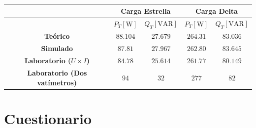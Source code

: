 \documentclass[letter,11pt]{article}
\begin{document}
\begin{center}
    \begin{tabular}{|c||c|c|c|c|}
    \hline
    & \multicolumn{2}{|c|}{\textbf{Carga Estrella}} &
    \multicolumn{2}{|c|}{\textbf{Carga Delta}}
    \tabularnewline \hline
    & $P_T[\text{W}]$ & $Q_T[\text{VAR}]$ &
    $P_T[\text{W}]$ & $Q_T[\text{VAR}]$
    \tabularnewline \hline \hline
    \textbf{Teórico} &
    $88.104$ & $27.679$ &
    $264.31$ & $83.036$
    \tabularnewline \hline
    \textbf{Simulado} &
    $ 87.81$ & $27.967$ &
    $262.80$ & $83.645$
    \tabularnewline \hline
    \textbf{Laboratorio ($U{\times}I$)} &
    $ 84.78$ & $25.614$ &
    $261.77$ & $80.149$
    \tabularnewline \hline
    \textbf{Laboratorio (Dos vatímetros)} &
    $94$ & $32$ &
    $277$ & $82$
    \tabularnewline \hline
    \end{tabular}
\end{center}

\section{Cuestionario}
\end{document}
